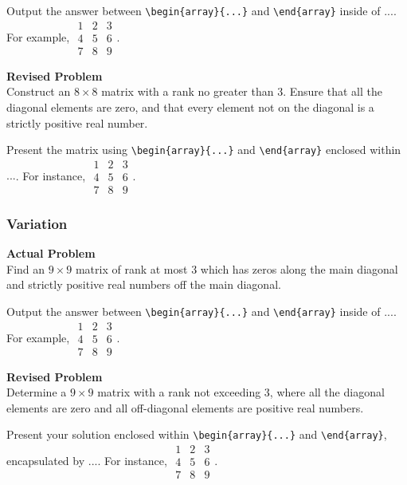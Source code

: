 Output the answer between \verb|\begin{array}{...}| and \verb|\end{array}| inside of $\boxed{...}$. For example, $\boxed{\begin{array}{ccc}1 & 2 & 3 \\ 4 & 5 & 6 \\ 7 & 8 & 9\end{array}}$.

\textbf{Revised Problem}\\
Construct an $8 \times 8$ matrix with a rank no greater than 3. Ensure that all the diagonal elements are zero, and that every element not on the diagonal is a strictly positive real number.

Present the matrix using \verb|\begin{array}{...}| and \verb|\end{array}| enclosed within $\boxed{...}$. For instance, $\boxed{\begin{array}{ccc}1 & 2 & 3 \\ 4 & 5 & 6 \\ 7 & 8 & 9\end{array}}$.

\subsubsection{Variation}
\textbf{Actual Problem}\\
Find an $9 \times 9$ matrix of rank at most 3 which has zeros along the main diagonal and strictly positive real numbers off the main diagonal.

Output the answer between \verb|\begin{array}{...}| and \verb|\end{array}| inside of $\boxed{...}$. For example, $\boxed{\begin{array}{ccc}1 & 2 & 3 \\ 4 & 5 & 6 \\ 7 & 8 & 9\end{array}}$.

\textbf{Revised Problem}\\
Determine a $9 \times 9$ matrix with a rank not exceeding 3, where all the diagonal elements are zero and all off-diagonal elements are positive real numbers.

Present your solution enclosed within \verb|\begin{array}{...}| and \verb|\end{array}|, encapsulated by $\boxed{...}$. For instance, $\boxed{\begin{array}{ccc}1 & 2 & 3 \\ 4 & 5 & 6 \\ 7 & 8 & 9\end{array}}$.

